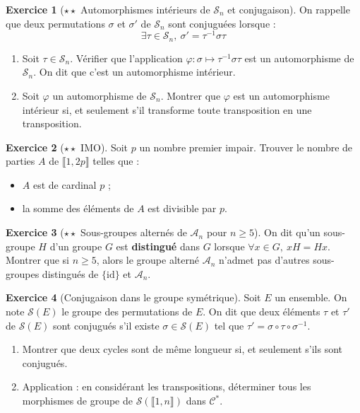 \documentclass[french]{book}
\newcommand{\st}{^*}
\newcommand{\inv}{^{-1}}
\theoremstyle{definition}
\newtheorem{ex}{Exercice}[chapter]
\theoremstyle{theorem}
\theoremstyle{remark}
\begin{document}
\begin{ex}[$\star\star$ Automorphismes intérieurs de $\mathcal{S}_n$ et conjugaison]
	On rappelle que deux permutations $\sigma$ et $\sigma'$ de $\mathcal{S}_n$ sont conjuguées lorsque : $$\exists\tau\in\mathcal{S}_n,\ \sigma'=\tau\inv\sigma\tau$$
	\begin{enumerate}
		\item Soit $\tau\in\mathcal{S}_n$. Vérifier que l'application $\varphi:\sigma\mapsto\tau\inv\sigma\tau$ est un automorphisme de $\mathcal{S}_n$. On dit que c'est un automorphisme intérieur.
		\item Soit $\varphi$ un automorphisme de $\mathcal{S}_n$. Montrer que $\varphi$ est un automorphisme intérieur si, et seulement s'il transforme toute transposition en une transposition.
	\end{enumerate}
\end{ex}

\begin{ex}[$\star\star$ IMO]
	Soit $p$ un nombre premier impair. Trouver le nombre de parties $A$ de $\llbracket 1,2p\rrbracket$ telles que : 
	\begin{itemize}
		\item $A$ est de cardinal $p$ ;
		\item la somme des éléments de $A$ est divisible par $p$.
	\end{itemize}
\end{ex}

\begin{ex}[$\star\star$ Sous-groupes alternés de $\mathcal{A}_n$ pour $n\geqslant 5$]
	On dit qu'un sous-groupe $H$ d'un groupe $G$ est \textbf{distingué} dans $G$ lorsque $\forall x\in G,\ xH=Hx$. Montrer que si $n\geqslant 5$, alors le groupe alterné $\mathcal{A}_n$ n'admet pas d'autres sous-groupes distingués de $\{\text{id}\}$ et $\mathcal{A}_n$.
\end{ex}

\begin{ex}[Conjugaison dans le groupe symétrique]
	Soit $E$ un ensemble. On note $\mathcal{S}(E)$ le groupe des permutations de $E$. On dit que deux éléments $\tau$ et $\tau'$ de $\mathcal{S}(E)$ sont conjugués s'il existe $\sigma\in\mathcal{S}(E)$ tel que $\tau'=\sigma\circ\tau\circ\sigma\inv$.
	\begin{enumerate}
		\item Montrer que deux cycles sont de même longueur si, et seulement s'ils sont conjugués.
		\item Application : en considérant les transpositions, déterminer tous les morphismes de groupe de $\mathcal{S}(\llbracket1,n\rrbracket)$ dans $\mathcal{C}\st$.
	\end{enumerate}
\end{ex}
\end{document}
